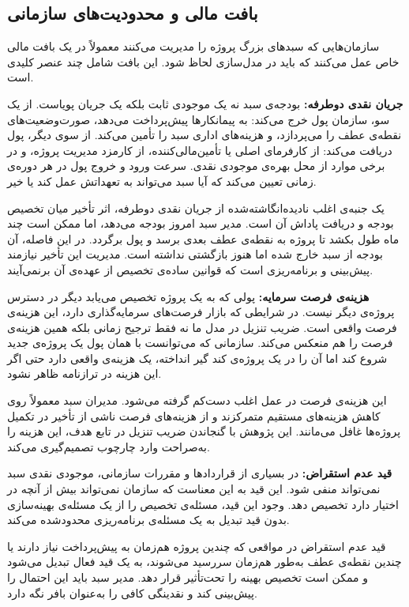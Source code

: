 \subsection{بافت مالی و محدودیت‌های سازمانی}
\label{subsec:financial_context}

سازمان‌هایی که سبدهای بزرگ پروژه را مدیریت می‌کنند معمولاً در یک
بافت مالی خاص عمل می‌کنند که باید در مدل‌سازی لحاظ شود. این بافت
شامل چند عنصر کلیدی است.

\textbf{جریان نقدی دوطرفه:} بودجه‌ی سبد نه یک موجودی ثابت بلکه یک
جریان پویاست. از یک سو، سازمان پول خرج می‌کند: به پیمانکارها
پیش‌پرداخت می‌دهد، صورت‌وضعیت‌های نقطه‌ی عطف را می‌پردازد، و
هزینه‌های اداری سبد را تأمین می‌کند. از سوی دیگر، پول دریافت
می‌کند: از کارفرمای اصلی یا تأمین‌مالی‌کننده، از کارمزد مدیریت
پروژه، و در برخی موارد از محل بهره‌ی موجودی نقدی. سرعت ورود و
خروج پول در هر دوره‌ی زمانی تعیین می‌کند که آیا سبد می‌تواند به
تعهداتش عمل کند یا خیر.

یک جنبه‌ی اغلب نادیده‌انگاشته‌شده از جریان نقدی دوطرفه، اثر
تأخیر میان تخصیص بودجه و دریافت پاداش آن است. مدیر سبد امروز
بودجه می‌دهد، اما ممکن است چند ماه طول بکشد تا پروژه به نقطه‌ی
عطف بعدی برسد و پول برگردد. در این فاصله، آن بودجه از سبد
خارج شده اما هنوز بازگشتی نداشته است. مدیریت این تأخیر نیازمند
پیش‌بینی و برنامه‌ریزی است که قوانین ساده‌ی تخصیص از عهده‌ی آن
برنمی‌آیند.

\textbf{هزینه‌ی فرصت سرمایه:} پولی که به یک پروژه تخصیص می‌یابد
دیگر در دسترس پروژه‌ی دیگر نیست. در شرایطی که بازار فرصت‌های
سرمایه‌گذاری دارد، این هزینه‌ی فرصت واقعی است. ضریب تنزیل در مدل
ما نه فقط ترجیح زمانی بلکه همین هزینه‌ی فرصت را هم منعکس می‌کند.
سازمانی که می‌توانست با همان پول یک پروژه‌ی جدید شروع کند اما آن
را در یک پروژه‌ی کند گیر انداخته، یک هزینه‌ی واقعی دارد حتی اگر
این هزینه در ترازنامه ظاهر نشود.

این هزینه‌ی فرصت در عمل اغلب دست‌کم گرفته می‌شود. مدیران سبد
معمولاً روی کاهش هزینه‌های مستقیم متمرکزند و از هزینه‌های فرصت
ناشی از تأخیر در تکمیل پروژه‌ها غافل می‌مانند. این پژوهش با
گنجاندن ضریب تنزیل در تابع هدف، این هزینه را به‌صراحت وارد
چارچوب تصمیم‌گیری می‌کند.

\textbf{قید عدم استقراض:} در بسیاری از قراردادها و مقررات سازمانی،
موجودی نقدی سبد نمی‌تواند منفی شود. این قید به این معناست که
سازمان نمی‌تواند بیش از آنچه در اختیار دارد تخصیص دهد. وجود این
قید، مسئله‌ی تخصیص را از یک مسئله‌ی بهینه‌سازی بدون قید تبدیل به
یک مسئله‌ی برنامه‌ریزی محدودشده می‌کند.

قید عدم استقراض در مواقعی که چندین پروژه هم‌زمان به پیش‌پرداخت
نیاز دارند یا چندین نقطه‌ی عطف به‌طور هم‌زمان سررسید می‌شوند،
به یک قید فعال تبدیل می‌شود و ممکن است تخصیص بهینه را تحت‌تأثیر
قرار دهد. مدیر سبد باید این احتمال را پیش‌بینی کند و نقدینگی
کافی را به‌عنوان بافر نگه دارد.


